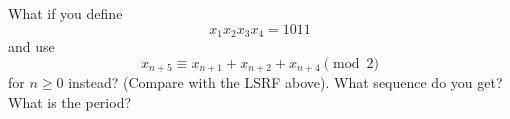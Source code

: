   What if you define
  \[
    x_1x_2x_3x_4 = 1011
  \]
  and use
  \[
    x_{n + 5} \equiv x_{n+1} + x_{n+2} + x_{n+4} \pmod{2}
  \]
  for $n \geq 0$ instead? (Compare with the LSRF above).
  What sequence do you get? What is the period?
